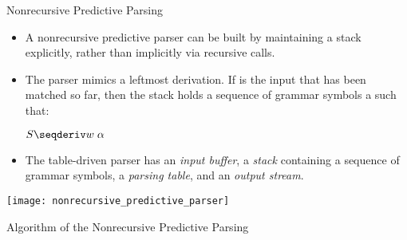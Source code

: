 \begin{bibunit}[apalike]
\begin{frame}{Nonrecursive Predictive Parsing}
	\begin{itemize}
	\item A nonrecursive predictive parser can be built by maintaining a stack explicitly, rather than implicitly via recursive calls.
	\item The parser mimics a leftmost derivation. If  is the input that has been matched so far, then the stack holds a sequence of grammar symbols a such that:
		\begin{center}
			$S \seqderiv w\;\alpha$
		\end{center}
	\item The table-driven parser has an \emph{input buffer}, a \emph{stack} containing a sequence of grammar symbols, a \emph{parsing table}, and an \emph{output stream}.
	\end{itemize}
	\begin{center}
		\texttt{[image: nonrecursive\_predictive\_parser]}
	\end{center}
\end{frame}

\begin{frame}{Algorithm of the Nonrecursive Predictive Parsing}
	\begin{tiny}
	\begin{myalgorithm}
	\end{myalgorithm}
	\end{tiny}
\end{frame}



\end{bibunit}
